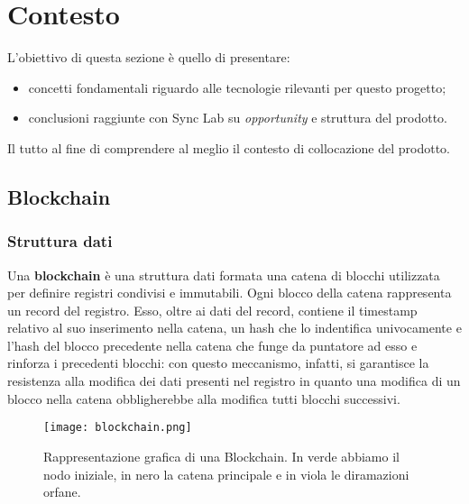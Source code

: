 
\chapter{Contesto}
\label{cap:contesto}
L’obiettivo di questa sezione è quello di presentare:
\begin{itemize}
    \item concetti fondamentali riguardo alle tecnologie rilevanti per questo progetto;
    \item conclusioni raggiunte con Sync Lab su \textit{opportunity} e struttura del prodotto.
\end{itemize}
Il tutto al fine di comprendere al meglio il contesto di collocazione del prodotto.

\section{Blockchain}
\label{contesto:blockchain}
    \subsection{Struttura dati}
    \label{contesto:blockchain:struttura}
    Una \textbf{blockchain} è una struttura dati formata una catena di blocchi utilizzata per definire registri condivisi e immutabili. Ogni blocco della catena rappresenta un record del registro. Esso, oltre ai dati del record, contiene il timestamp relativo al suo inserimento nella catena, un hash che lo indentifica univocamente e l'hash del blocco precedente nella catena che funge da puntatore ad esso e rinforza i precedenti blocchi: con questo meccanismo, infatti, si garantisce la resistenza alla modifica dei dati presenti nel registro in quanto una modifica di un blocco nella catena obbligherebbe alla modifica tutti blocchi successivi.

    \begin{figure}[h!]
        \centering
        \texttt{[image: blockchain.png]}
        \caption[Rappresentazione grafica di una Blockchain]{Rappresentazione grafica di una Blockchain. In verde abbiamo il nodo iniziale, in nero la catena principale e in viola le diramazioni orfane.}
    \end{figure}

